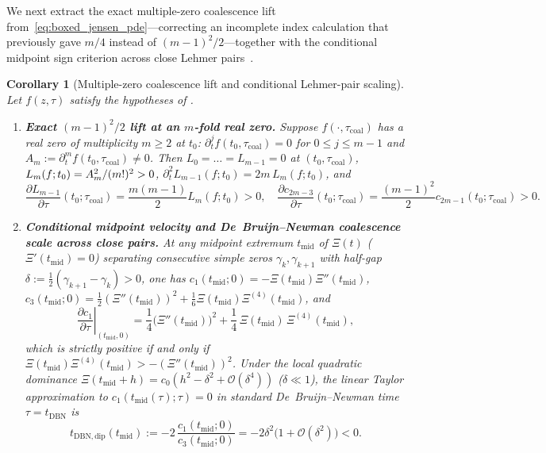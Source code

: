 \documentclass[11pt,reqno]{amsart}
\theoremstyle{plain}
\newtheorem{corollary}[theorem]{Corollary}
\theoremstyle{definition}
\theoremstyle{remark}
\numberwithin{equation}{section}
\newcommand{\fac}{\mathclose{\mathchar"0021}}
\begin{document}
We next extract the exact multiple-zero coalescence lift from~\eqref{eq:boxed_jensen_pde}—correcting an incomplete index calculation that previously gave $m/4$ instead of $(m-1)^2/2$—together with the conditional midpoint sign criterion across close Lehmer pairs~\cite{lehmer1956,csordas1988,csordas1994}.

\begin{corollary}[Multiple-zero coalescence lift and conditional Lehmer-pair scaling]\label{cor:coalescence_lehmer}
Let $f(z,\tau)$ satisfy the hypotheses of .
\begin{enumerate}[label=\textup{(\roman*)},leftmargin=2.2em]
\item \textbf{Exact $(m-1)^2/2$ lift at an $m$-fold real zero.} Suppose $f(\cdot, \tau_{\mathrm{coal}})$ has a real zero of multiplicity $m \ge 2$ at $t_0$: $\partial_t^j f(t_0, \tau_{\mathrm{coal}}) = 0$ for $0 \le j \le m - 1$ and $A_m := \partial_t^m f(t_0, \tau_{\mathrm{coal}}) \neq 0$. Then $L_0 = \dots = L_{m-1} = 0$ at $(t_0, \tau_{\mathrm{coal}})$, $L_m(f; t_0) = A_m^2/(m\fac)^2 > 0$, $\partial_t^2 L_{m-1}(f; t_0) = 2m\,L_m(f; t_0)$, and
\begin{equation}\label{eq:exact_mfold_lift}
\frac{\partial L_{m-1}}{\partial\tau}(t_0; \tau_{\mathrm{coal}}) = \frac{m(m - 1)}{2}L_m(f; t_0) > 0, \quad \frac{\partial c_{2m-3}}{\partial\tau}(t_0; \tau_{\mathrm{coal}}) = \frac{(m - 1)^2}{2}c_{2m-1}(t_0; \tau_{\mathrm{coal}}) > 0.
\end{equation}
\item \textbf{Conditional midpoint velocity and De~Bruijn--Newman coalescence scale across close pairs.} At any midpoint extremum $t_{\mathrm{mid}}$ of $\Xi(t)$ ($\Xi'(t_{\mathrm{mid}}) = 0$) separating consecutive simple zeros $\gamma_k, \gamma_{k+1}$ with half-gap $\delta := \frac{1}{2}(\gamma_{k+1} - \gamma_k) > 0$, one has $c_1(t_{\mathrm{mid}}; 0) = -\Xi(t_{\mathrm{mid}})\Xi''(t_{\mathrm{mid}})$, $c_3(t_{\mathrm{mid}}; 0) = \frac{1}{2}(\Xi''(t_{\mathrm{mid}}))^2 + \frac{1}{6}\Xi(t_{\mathrm{mid}})\Xi^{(4)}(t_{\mathrm{mid}})$, and
\begin{equation}\label{eq:midpoint_velocity}
\left.\frac{\partial c_1}{\partial\tau}\right|_{(t_{\mathrm{mid}}, 0)} = \frac{1}{4}\bigl(\Xi''(t_{\mathrm{mid}})\bigr)^2 + \frac{1}{4}\,\Xi(t_{\mathrm{mid}})\,\Xi^{(4)}(t_{\mathrm{mid}}),
\end{equation}
which is strictly positive \emph{if and only if} $\Xi(t_{\mathrm{mid}})\Xi^{(4)}(t_{\mathrm{mid}}) > -(\Xi''(t_{\mathrm{mid}}))^2$. Under the local quadratic dominance $\Xi(t_{\mathrm{mid}} + h) = c_0(h^2 - \delta^2 + \mathcal{O}(\delta^4))$ ($\delta \ll 1$), the linear Taylor approximation to $c_1(t_{\mathrm{mid}}(\tau); \tau) = 0$ in standard De~Bruijn--Newman time $\tau = t_{\mathrm{DBN}}$ is
\begin{equation}\label{eq:lehmer_tau_coal}
t_{\mathrm{DBN,dip}}(t_{\mathrm{mid}}) := -2\,\frac{c_1(t_{\mathrm{mid}}; 0)}{c_3(t_{\mathrm{mid}}; 0)} = -2\delta^2\bigl(1 + \mathcal{O}(\delta^2)\bigr) < 0.
\end{equation}
\end{enumerate}
\end{corollary}
\end{document}
